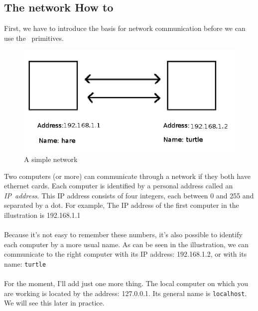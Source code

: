 \subsection{The network How to}
First, we have to introduce the basis for network communication before we can use the \xlogo\ primitives.
\begin{figure}[h]
\includegraphics{pics/network.png}
\caption{A simple network}
\end{figure}
Two computers (or more) can communicate through a network if they both have ethernet cards. Each computer is identified by a personal address called an \textit{IP~address}. This IP address consists of four integers, each between 0 and 255 and separated by a dot. For example, The IP address of the first computer in the illustration is 192.168.1.1\\ \\
Because it's not easy to remember these numbers, it's also possible to identify each computer by a more usual name. As can be seen in the illustration, we can communicate to the right computer with its IP address: 192.168.1.2, or with its name: \texttt{turtle}\\ \\
For the moment, I'll add just one more thing. The local computer on which you are working is located by the address: 127.0.0.1. Its general name is \texttt{localhost}. We will see this later in practice. 
